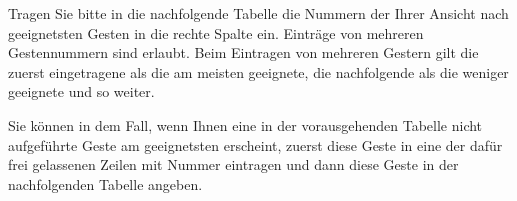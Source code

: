 \documentclass[11pt,a4paper,notitlepage]{article}
\begin{document}
\begin{center}
\begin{supertabular}{rcl}
\end{supertabular}
\end{center}

Tragen Sie bitte in die nachfolgende Tabelle die Nummern der Ihrer Ansicht nach geeignetsten Gesten
in die rechte Spalte ein. Einträge von mehreren Gestennummern sind erlaubt. Beim Eintragen von mehreren
Gestern gilt die zuerst eingetragene als die am meisten geeignete, die nachfolgende als die weniger geeignete
und so weiter.

Sie können in dem Fall, wenn Ihnen eine in der vorausgehenden Tabelle nicht aufgeführte Geste am geeignetsten
erscheint, zuerst diese Geste in eine der dafür frei gelassenen Zeilen mit Nummer eintragen und dann diese
Geste in der nachfolgenden Tabelle angeben.
\end{document}
